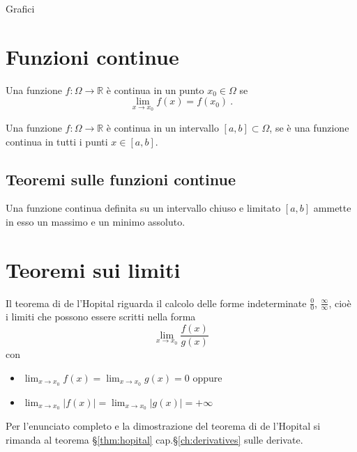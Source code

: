 {\color{red}Grafici}

\section{Funzioni continue}
\begin{definition} Una funzione $f: \Omega \rightarrow \mathbb{R}$ è continua in un punto $x_0 \in \Omega$ se 
    \begin{equation}
        \lim_{x \rightarrow x_0}f(x) = f(x_0) \ .
    \end{equation}
\end{definition}
\begin{definition} Una funzione $f: \Omega \rightarrow \mathbb{R}$ è continua in un intervallo $[a, b] \subset \Omega$, se è una funzione continua in tutti i punti $x \in [a, b]$.
\end{definition}

\subsection{Teoremi sulle funzioni continue}
\begin{theorem}\label{thm:weierstrass} Una funzione continua definita su un intervallo chiuso e limitato $[a, b]$ ammette in esso un massimo e un minimo assoluto.
\end{theorem}

\section{Teoremi sui limiti}
\begin{theorem}\label{thm:comparison}
\end{theorem}

\begin{theorem}\label{thm:hopital:0} Il teorema di de l'Hopital riguarda il calcolo delle forme indeterminate $\frac{0}{0}$, $\frac{\infty}{\infty}$, cioè i limiti che possono essere scritti nella forma
    \begin{equation}
        \lim_{x \rightarrow x_0} \dfrac{f(x)}{g(x)}
    \end{equation}
    con
    \begin{itemize}
        \item $\lim_{x \rightarrow x_0} f(x) = \lim_{x \rightarrow x_0} g(x) = 0$ oppure
        \item $\lim_{x \rightarrow x_0} |f(x)| = \lim_{x \rightarrow x_0} |g(x)| = +\infty$
    \end{itemize}
\end{theorem}
    Per l'enunciato completo e la dimostrazione del teorema di de l'Hopital si rimanda al teorema \S\ref{thm:hopital} cap.\S\ref{ch:derivatives} sulle derivate.

